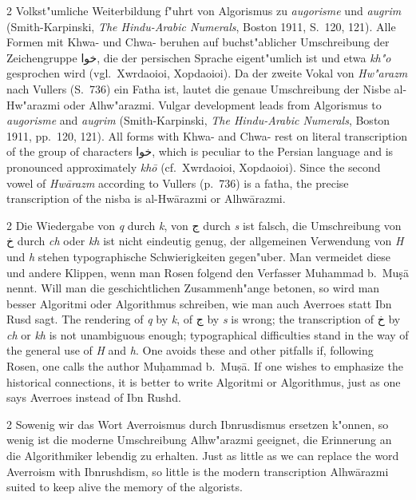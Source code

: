 \documentclass[10pt,a4paper]{article}
\renewcommand{\switchcolumn}{\syncronize\nointerlineskip\columnbreak}
\newcommand{\greekname}[1]{{\greekfont #1}}
\newcommand{\RL}[1]{\beginR#1\endR}
\newcommand{\ar}[1]{{\arabicfont\RL{#1}}}
\begin{document}
\begin{paracol}{2}
Volkst"umliche Weiterbildung f"uhrt von Algorismus zu \textit{augorisme} und \textit{augrim} (Smith-Karpinski, \textit{The Hindu-Arabic Numerals}, Boston 1911, S.\ 120, 121). Alle Formen mit Khwa- und Chwa- beruhen auf buchst"ablicher Umschreibung der Zeichengruppe \ar{خوا}, die der persischen Sprache eigent"umlich ist und etwa \textit{kh"o} gesprochen wird (vgl.\ \greekname Xwrdaoioi, Xopdaoioi). Da der zweite Vokal von \textit{Hw"arazm} nach Vullers (S.\ 736) ein Fatha ist, lautet die genaue Umschreibung der Nisbe al-Hw"arazmi oder Alhw"arazmi.
\switchcolumn
Vulgar development leads from Algorismus to \textit{augorisme} and \textit{augrim} (Smith-Karpinski, \textit{The Hindu-Arabic Numerals}, Boston 1911, pp.\ 120, 121). All forms with Khwa- and Chwa- rest on literal transcription of the group of characters \ar{خوا}, which is peculiar to the Persian language and is pronounced approximately \textit{kh\=o} (cf.\ \greekname Xwrdaoioi, Xopdaoioi). Since the second vowel of \textit{Hw\=arazm} according to Vullers (p.\ 736) is a fatha, the precise transcription of the nisba is al-Hw\=arazmi or Alhw\=arazmi.
\end{paracol}

\begin{paracol}{2}
Die Wiedergabe von \textit{q} durch \textit{k}, von \ar{ج} durch \textit{s} ist falsch, die Umschreibung von \ar{خ} durch \textit{ch} oder \textit{kh} ist nicht eindeutig genug, der allgemeinen Verwendung von \textit{H} und \textit{h} stehen typographische Schwierigkeiten gegen"uber. Man vermeidet diese und andere Klippen, wenn man Rosen folgend den Verfasser Muhammad b.\ Mu\d{s}\d{}\=a nennt. Will man die geschichtlichen Zusammenh"ange betonen, so wird man besser Algoritmi oder Algorithmus schreiben, wie man auch Averroes statt Ibn Rusd sagt.
\switchcolumn
The rendering of \textit{q} by \textit{k}, of \ar{ج} by \textit{s} is wrong; the transcription of \ar{خ} by \textit{ch} or \textit{kh} is not unambiguous enough; typographical difficulties stand in the way of the general use of \textit{H} and \textit{h}. One avoids these and other pitfalls if, following Rosen, one calls the author Mu\d{h}ammad b.\ Mu\d{s}\=a. If one wishes to emphasize the historical connections, it is better to write Algoritmi or Algorithmus, just as one says Averroes instead of Ibn Rushd.
\end{paracol}

\begin{paracol}{2}
Sowenig wir das Wort Averroismus durch Ibnrusdismus ersetzen k"onnen, so wenig ist die moderne Umschreibung Alhw"arazmi geeignet, die Erinnerung an die Algorithmiker lebendig zu erhalten.
\switchcolumn
Just as little as we can replace the word Averroism with Ibnrushdism, so little is the modern transcription Alhw\=arazmi suited to keep alive the memory of the algorists.
\end{paracol}
\clearpage
\end{document}
